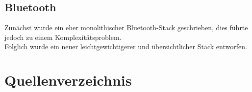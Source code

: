 \documentclass[12pt,a4paper]{article}
\begin{document}
\subsection{Bluetooth}
Zunächst wurde ein eher monolithischer Bluetooth-Stack geschrieben, dies führte jedoch zu einem Komplexitätsproblem.\\
Folglich wurde ein neuer leichtgewichtigerer und übersichtlicher Stack entworfen.


\section{Quellenverzeichnis}
\end{document}
